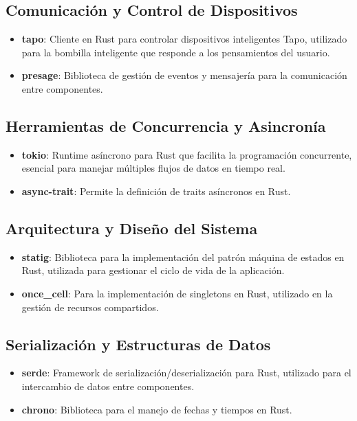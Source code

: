 \subsection{Comunicación y Control de Dispositivos}
\begin{itemize}
    \item \textbf{tapo}: Cliente en Rust para controlar dispositivos inteligentes Tapo, utilizado para la bombilla inteligente que responde a los pensamientos del usuario.
    \item \textbf{presage}: Biblioteca de gestión de eventos y mensajería para la comunicación entre componentes.
\end{itemize}

\subsection{Herramientas de Concurrencia y Asincronía}
\begin{itemize}
    \item \textbf{tokio}: Runtime asíncrono para Rust que facilita la programación concurrente, esencial para manejar múltiples flujos de datos en tiempo real.
    \item \textbf{async-trait}: Permite la definición de traits asíncronos en Rust.
\end{itemize}

\subsection{Arquitectura y Diseño del Sistema}
\begin{itemize}
    \item \textbf{statig}: Biblioteca para la implementación del patrón máquina de estados en Rust, utilizada para gestionar el ciclo de vida de la aplicación.
    \item \textbf{once\_cell}: Para la implementación de singletons en Rust, utilizado en la gestión de recursos compartidos.
\end{itemize}

\subsection{Serialización y Estructuras de Datos}
\begin{itemize}
    \item \textbf{serde}: Framework de serialización/deserialización para Rust, utilizado para el intercambio de datos entre componentes.
    \item \textbf{chrono}: Biblioteca para el manejo de fechas y tiempos en Rust.
\end{itemize}
